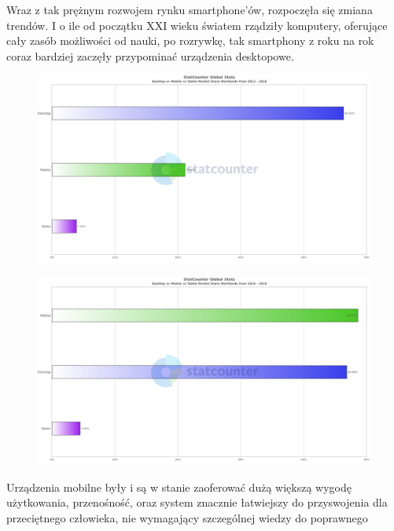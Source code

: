 \documentclass[12pt, a4paper]{article}
\begin{document}
\begin{sloppypar}
{{    Wraz z tak prężnym rozwojem rynku smartphone'ów, rozpoczęła się zmiana trendów.
    I o ile od początku XXI wieku światem rządziły komputery, oferujące cały zasób 
    możliwości od nauki, po rozrywkę, tak smartphony z roku na rok coraz bardziej 
    zaczęły przypominać urządzenia desktopowe. 
    \begin{figure}[H]
      \centering
      \includegraphics[width=.9\textwidth]{systems_chart1.png}
      \label{fig:2013}
    \end{figure} 
    \begin{figure}[H]
      \centering
      \includegraphics[width=.9\textwidth]{systems_chart2.png}
      \label{fig:2016}
    \end{figure} 
    Urządzenia mobilne były i są w stanie zaoferować dużą większą wygodę 
    użytkowania, przenośność, oraz system znacznie łatwiejszy do przyswojenia dla 
    przeciętnego człowieka, nie wymagający szczególnej wiedzy do poprawnego
}}
\end{sloppypar}
\end{document}
